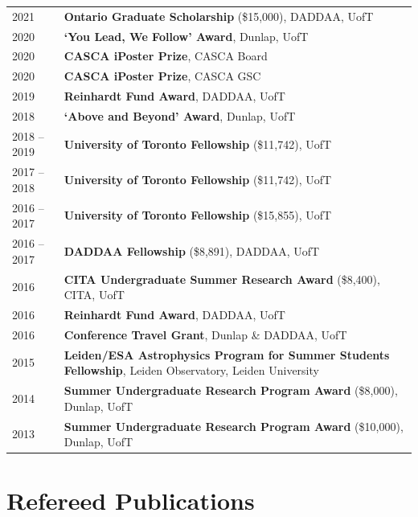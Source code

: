 \documentclass[10pt]{res} %
\begin{document}
\begin{resume}
\begin{table}[h!]
\begin{tabularx}{\textwidth}{lX}
2021 & \textbf{Ontario Graduate Scholarship} (\$15,000), DADDAA, UofT  \\
2020 & \textbf{`You Lead, We Follow' Award}, Dunlap, UofT \\
2020 & \textbf{CASCA iPoster Prize}, CASCA Board \\
2020 & \textbf{CASCA iPoster Prize}, CASCA GSC \\
2019 & \textbf{Reinhardt Fund Award}, DADDAA, UofT \\
2018 & \textbf{`Above and Beyond' Award}, Dunlap, UofT \\
2018 -- 2019 & \textbf{University of Toronto Fellowship} (\$11,742), UofT \\
2017 -- 2018 & \textbf{University of Toronto Fellowship} (\$11,742), UofT \\
2016 -- 2017 & \textbf{University of Toronto Fellowship} (\$15,855), UofT \\
2016 -- 2017 & \textbf{DADDAA Fellowship} (\$8,891), DADDAA, UofT \\
2016 & \textbf{CITA Undergraduate Summer Research Award} (\$8,400), CITA, UofT \\
2016 & \textbf{Reinhardt Fund Award}, DADDAA, UofT \\
2016 & \textbf{Conference Travel Grant}, Dunlap \& DADDAA, UofT \\
2015 & \textbf{Leiden/ESA Astrophysics Program for Summer Students Fellowship}, Leiden Observatory, Leiden University \\
2014 & \textbf{Summer Undergraduate Research Program Award} (\$8,000), Dunlap, UofT \\
2013 & \textbf{Summer Undergraduate Research Program Award} (\$10,000), Dunlap, UofT
\end{tabularx}
\end{table}


\section{\Large Refereed Publications}
\vspace{-5pt} %
\noindent\makebox[\linewidth]{\rule{\textwidth}{0.4pt}}
\vspace{-15pt} %


\end{resume}
\end{document}
